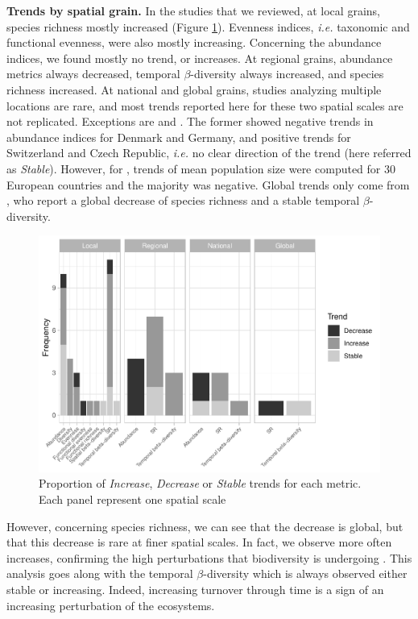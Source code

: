 \documentclass[
  12pt,
  oneside]{report}
\begin{document}
\textbf{Trends by spatial grain.} In the studies that we reviewed, at local grains, species richness mostly increased (Figure \ref{fig:barmetricsperspatscale}). Evenness indices, \emph{i.e.} taxonomic and functional evenness, were also mostly increasing. Concerning the abundance indices, we found mostly no trend, or increases. At regional grains, abundance metrics always decreased, temporal \(\beta\)-diversity always increased, and species richness increased. At national and global grains, studies analyzing multiple locations are rare, and most trends reported here for these two spatial scales are not replicated. Exceptions are \textcite{bowler_geographic_2021} and \textcite{donald_agricultural_2001}. The former showed negative trends in abundance indices for Denmark and Germany, and positive trends for Switzerland and Czech Republic, \emph{i.e.} no clear direction of the trend (here referred as \emph{Stable}). However, for \textcite{donald_agricultural_2001}, trends of mean population size were computed for 30 European countries and the majority was negative. Global trends only come from \textcite{jarzyna_taxonomic_2018}, who report a global decrease of species richness and a stable temporal \(\beta\)-diversity.

\begin{figure}
\centering
\includegraphics{literature_review_files/figure-latex/barmetricsperspatscale-1.pdf}
\caption{\label{fig:barmetricsperspatscale}Proportion of \emph{Increase}, \emph{Decrease} or \emph{Stable} trends for each metric. Each panel represent one spatial scale}
\end{figure}

However, concerning species richness, we can see that the decrease is global, but that this decrease is rare at finer spatial scales. In fact, we observe more often increases, confirming the high perturbations that biodiversity is undergoing \autocite{dornelas_assemblage_2014,vaidyanathan_worlds_2021}. This analysis goes along with the temporal \(\beta\)-diversity which is always observed either stable or increasing. Indeed, increasing turnover through time is a sign of an increasing perturbation of the ecosystems.
\end{document}
